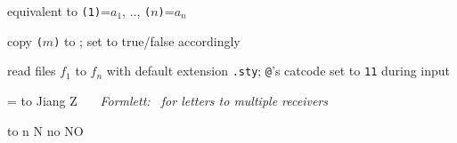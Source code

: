 {{




%
   {equivalent to {\tt{}(1)}=$a_1$, ..,
   {\tt{}($n$)}=$a_n$}



%
      {copy {\tt\ABC($m$)} to {\tt\string\cachedata};
       set {\tt\string\ifemptydata} to true/false accordingly}


\hruler

%
      {read files $f_1$ to $f_n$ with default extension {\tt .sty};
       {\tt @}'s catcode set to {\tt 11} during input}

\hruler


}

\footline={
\hbox to \hsize
 {{\rm Jiang Z ~~~{\sl Formlett: ~for letters to multiple receivers}
\hss \folio}}}

\vskip 8in

\endcolumns
\vfill\eject






%
 to \reply \def\nono{n }\def\Nono{N }\def\noNo{no }\def\NoNo{NO }%
\def\next{}%
\ifx\reply\nono\else\ifx\reply\Nono\else\ifx\reply\noNo\else
\ifx\reply\NoNo\else\let\next\relax
{}\fi\fi\fi\fi \next





%


%
%

}
